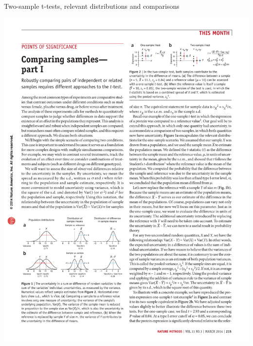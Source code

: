 \documentclass[presentation]{beamer}
\begin{document}
\begin{frame}[label={sec:org13f7c3c}]{Two-sample t-tests, relevant distributions and comparisons}
\begin{center}
\includegraphics[height=0.33\textheight]{fig-twosample-distns.pdf}
\end{center}



\end{frame}
\end{document}
